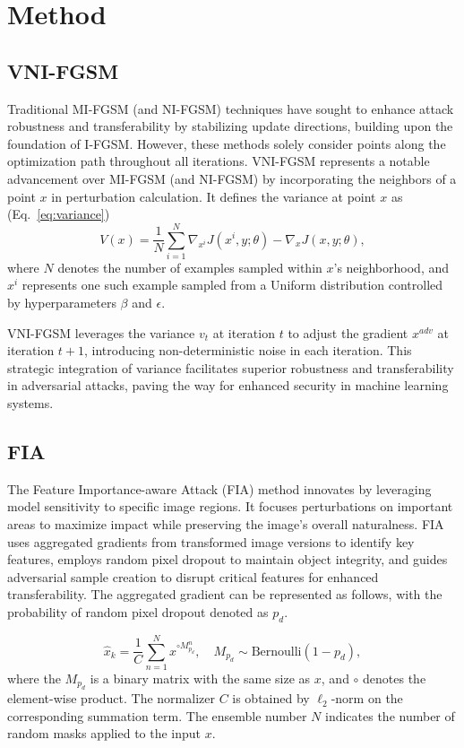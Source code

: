 \section{Method}

\subsection{VNI-FGSM}
Traditional MI-FGSM (and NI-FGSM) techniques have sought to enhance attack robustness and transferability by stabilizing update directions, building upon the foundation of I-FGSM. However, these methods solely consider points along the optimization path throughout all iterations. VNI-FGSM represents a notable advancement over MI-FGSM (and NI-FGSM) by incorporating the neighbors of a point $x$ in perturbation calculation. It defines the variance at point $x$ as (Eq.~\ref{eq:variance}) 
\begin{equation}
    V(x) = \frac{1}{N} \sum_{i=1}^{N} \nabla_{x^i} J(x^i, y;\theta) - \nabla_{x} J(x, y;\theta),
\label{eq:variance}
\end{equation}
where $N$ denotes the number of examples sampled within $x$'s neighborhood, and $x^i$ represents one such example sampled from a Uniform distribution controlled by hyperparameters $\beta$ and $\epsilon$.

VNI-FGSM leverages the variance $v_t$ at iteration $t$ to adjust the gradient $x^{adv}$ at iteration $t+1$, introducing non-deterministic noise in each iteration. This strategic integration of variance facilitates superior robustness and transferability in adversarial attacks, paving the way for enhanced security in machine learning systems.

\subsection{FIA}
The Feature Importance-aware Attack (FIA) method innovates by leveraging model sensitivity to specific image regions. It focuses perturbations on important areas to maximize impact while preserving the image's overall naturalness. FIA uses aggregated gradients from transformed image versions to identify key features, employs random pixel dropout to maintain object integrity, and guides adversarial sample creation to disrupt critical features for enhanced transferability. The aggregated gradient can be represented as follows, with the probability of random pixel dropout denoted as \( p_d \).

\begin{equation}
\hat{x}_k = \frac{1}{C} \sum_{n=1}^{N} x^{\circ M^n_{p_d}}, \quad M_{p_d} \sim \text{Bernoulli}(1 - p_d),
\end{equation}
where the \(M_{p_d}\) is a binary matrix with the same size as \(x\), and \(\circ\) denotes the element-wise product. The normalizer \(C\) is obtained by \(\ell_2\)-norm on the corresponding summation term. The ensemble number \(N\) indicates the number of random masks applied to the input \(x\).


